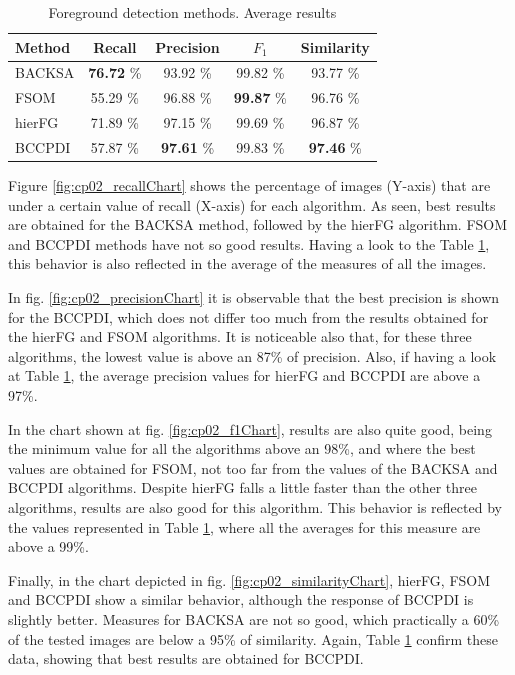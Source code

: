 \begin{table}[t]
\begin{center}
\caption{Foreground detection methods. Average results}\label{table:fgAverage}
\resizebox{0.5\columnwidth}{!} {
\begin{tabular}{|l|c|c|c|c|}
\hline
Method & Recall & Precision & $F_1$ & Similarity \\
\hline
BACKSA & \textbf{76.72} \% & 93.92 \% & 99.82 \% & 93.77 \% \\
FSOM & 55.29 \% & 96.88 \% & \textbf{99.87} \% & 96.76 \% \\
hierFG & 71.89 \% & 97.15 \% & 99.69 \% & 96.87 \% \\
BCCPDI & 57.87 \% & \textbf{97.61} \% & 99.83 \% & \textbf{97.46} \% \\
\hline
\end{tabular}
}
\end{center}
\end{table}

Figure \ref{fig:cp02_recallChart} shows the percentage of images (Y-axis) that are under a certain value of recall (X-axis) 
for each algorithm. As seen, best results are obtained for the BACKSA method, followed by the hierFG algorithm.  FSOM 
and BCCPDI methods have not so good results. Having a look to the Table \ref{table:fgAverage}, this behavior is also 
reflected in the average of the measures of all the images.

In fig. \ref{fig:cp02_precisionChart} it is observable that the best precision is shown for the BCCPDI, which does not 
differ too much from the results obtained for the hierFG and FSOM algorithms. It is noticeable also that, for these 
three algorithms, the lowest value is above an 87\% of precision. Also, if having a look at Table \ref{table:fgAverage}, 
the average precision values for hierFG and BCCPDI are above a 97\%.

In the chart shown at fig. \ref{fig:cp02_f1Chart}, results are also quite good, being the minimum value for all the 
algorithms above an 98\%, and where the best values are obtained for FSOM, not too far from the values of the BACKSA and 
BCCPDI algorithms. Despite hierFG falls a little faster than the other three algorithms, results are also good for this 
algorithm. This behavior is reflected by the values represented in Table \ref{table:fgAverage}, where all the averages 
for this measure are above a 99\%.

Finally, in the chart depicted in fig. \ref{fig:cp02_similarityChart}, hierFG, FSOM and BCCPDI show a similar behavior, 
although the response of BCCPDI is slightly better. Measures for BACKSA are not so good, which practically a 60\% of the 
tested images are below a 95\% of similarity. Again, Table \ref{table:fgAverage} confirm these data, showing that best 
results are obtained for BCCPDI.

